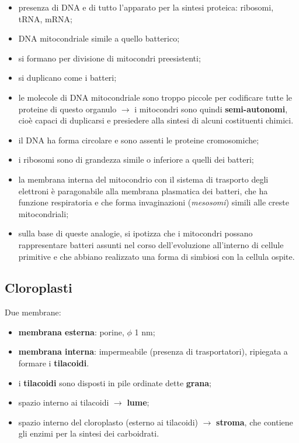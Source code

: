 \begin{itemize}
  \item presenza di DNA e di tutto l'apparato per la sintesi proteica: ribosomi, tRNA, mRNA;
  \item DNA mitocondriale simile a quello batterico;
  \item si formano per divisione di mitocondri preesistenti;
  \item si duplicano come i batteri;
  \item le molecole di DNA mitocondriale sono troppo piccole per codificare tutte le proteine di questo organulo $\rightarrow$ i mitocondri sono quindi \textbf{semi-autonomi}, cioè capaci di duplicarsi e presiedere alla sintesi di alcuni costituenti chimici.
\end{itemize}

\begin{itemize}
  \item il DNA ha forma circolare e sono assenti le proteine cromosomiche;
  \item i ribosomi sono di grandezza simile o inferiore a quelli dei batteri;
  \item la membrana interna del mitocondrio con il sistema di trasporto degli elettroni è paragonabile alla membrana plasmatica dei batteri, che ha funzione respiratoria e che forma invaginazioni (\textit{mesosomi}) simili alle creste mitocondriali;
  \item sulla base di queste analogie, si ipotizza che i mitocondri possano rappresentare batteri assunti nel corso dell'evoluzione all'interno di cellule primitive e che abbiano realizzato una forma di simbiosi con la cellula ospite.
\end{itemize}

\subsection{Cloroplasti}

Due membrane:
\begin{itemize}
  \item \textbf{membrana esterna}: porine, $\phi$ 1 nm;
  \item \textbf{membrana interna}: impermeabile (presenza di trasportatori), ripiegata a formare i \textbf{tilacoidi}.
\end{itemize}
\begin{itemize}
  \item i \textbf{tilacoidi} sono disposti in pile ordinate dette \textbf{grana};
  \item spazio interno ai tilacoidi $\rightarrow$ \textbf{lume};
  \item spazio interno del cloroplasto (esterno ai tilacoidi) $\rightarrow$ \textbf{stroma}, che contiene gli enzimi per la sintesi dei carboidrati.
\end{itemize}

